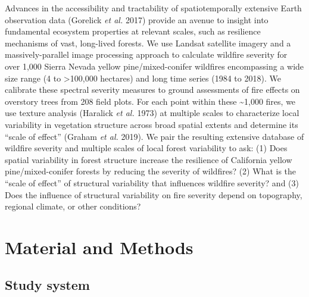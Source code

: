 \documentclass[]{article}
\begin{document}
Advances in the accessibility and tractability of spatiotemporally
extensive Earth observation data (Gorelick \emph{et al.} 2017) provide
an avenue to insight into fundamental ecosystem properties at relevant
scales, such as resilience mechanisms of vast, long-lived forests. We
use Landsat satellite imagery and a massively-parallel image processing
approach to calculate wildfire severity for over 1,000 Sierra Nevada
yellow pine/mixed-conifer wildfires encompassing a wide size range (4 to
\textgreater{}100,000 hectares) and long time series (1984 to 2018). We
calibrate these spectral severity measures to ground assessments of fire
effects on overstory trees from 208 field plots. For each point within
these \textasciitilde{}1,000 fires, we use texture analysis (Haralick
\emph{et al.} 1973) at multiple scales to characterize local variability
in vegetation structure across broad spatial extents and determine its
``scale of effect'' (Graham \emph{et al.} 2019). We pair the resulting
extensive database of wildfire severity and multiple scales of local
forest variability to ask: (1) Does spatial variability in forest
structure increase the resilience of California yellow
pine/mixed-conifer forests by reducing the severity of wildfires? (2)
What is the ``scale of effect'' of structural variability that
influences wildfire severity? and (3) Does the influence of structural
variability on fire severity depend on topography, regional climate, or
other conditions?

\hypertarget{material-and-methods}{%
\section{Material and Methods}\label{material-and-methods}}

\hypertarget{study-system}{%
\subsection{Study system}\label{study-system}}
\end{document}
